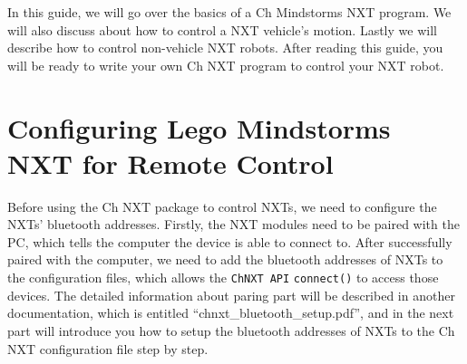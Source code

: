 \documentclass[11pt]{article}
\begin{document}
In this guide, we will go over the basics of a Ch Mindstorms NXT program. We will also discuss 
about how to control a NXT vehicle's motion. Lastly we will describe how to control non-vehicle
NXT robots. After reading this guide, you will be ready to write your own Ch NXT program to 
control your NXT robot.

\newpage
\section{Configuring Lego Mindstorms NXT for Remote Control}
Before using the Ch NXT package to control NXTs, we need to configure the NXTs' 
bluetooth addresses. Firstly, the NXT modules need to be paired with the PC, 
which tells the computer the device is able to connect to. After successfully 
paired with the computer, we need to add the bluetooth addresses of NXTs to the 
configuration files, which allows the {\tt ChNXT API} {\tt connect()} to access 
those devices. The detailed information about paring part will be described in 
another documentation, which is entitled ``chnxt\_bluetooth\_setup.pdf'', and in 
the next part will introduce you how to setup the bluetooth addresses of NXTs 
to the Ch NXT configuration file step by step.
\end{document}
